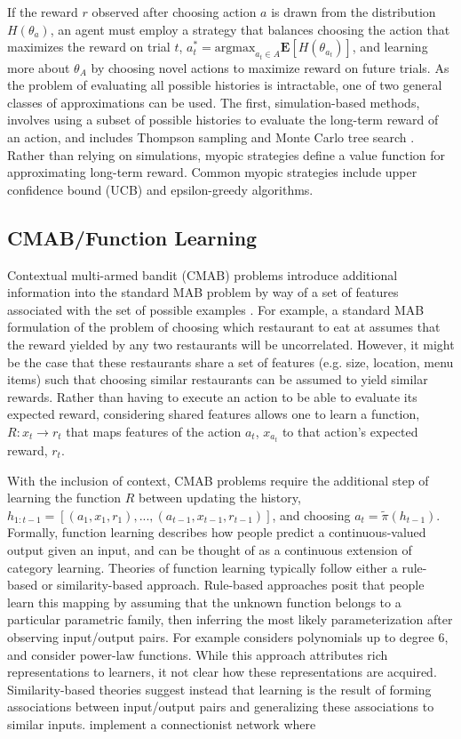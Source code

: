 \documentclass[10pt,letterpaper]{article}
\begin{document}
	If the reward $r$ observed after choosing action $a$ is drawn from the distribution $H(\theta_{a})$, an agent must employ a strategy that balances choosing the action that maximizes the reward on trial $t$, $a_{t}^{*} = \text{argmax}_{a_{t} \in A} \mathbf{E}[H(\theta_{a_{t}})]$, and learning more about $\theta_{A}$ by choosing novel actions to maximize reward on future trials. As the problem of evaluating all possible histories is intractable, one of two general classes of approximations can be used. The first, simulation-based methods, involves using a subset of possible histories to evaluate the long-term reward of an action, and includes Thompson sampling \citep{Thompson} and Monte Carlo tree search \citep{Coulom2007}. Rather than relying on simulations, myopic strategies define a value function for approximating long-term reward. Common myopic strategies include upper confidence bound (UCB) \citep{Agrawal} and epsilon-greedy \citep{Sutton1998a} algorithms.
	
	\subsection{CMAB/Function Learning}
	
	Contextual multi-armed bandit (CMAB) problems introduce additional information into the standard MAB problem by way of a set of features associated with the set of possible examples \citep{Langford}. For example, a standard MAB formulation of the problem of choosing which restaurant to eat at assumes that the reward yielded by any two restaurants will be uncorrelated. However, it might be the case that these restaurants share a set of features (e.g. size, location, menu items) such that choosing similar restaurants can be assumed to yield similar rewards. Rather than having to execute an action to be able to evaluate its expected reward, considering shared features allows one to learn a function, $R: x_{t} \to r_{t}$ that maps features of the action $a_{t}$, $x_{a_{t}}$ to that action's expected reward, $r_{t}$.
	
	With the inclusion of context, CMAB problems require the additional step of learning the function $R$ between updating the history, $h_{1:t-1} = [(a_{1}, x_{1}, r_{1}),...,(a_{t-1}, x_{t-1}, r_{t-1})]$, and choosing $a_{t} = \tilde{\pi}(h_{t-1})$. Formally, function learning describes how people predict a continuous-valued output given an input, and can be thought of as a continuous extension of category learning. Theories of function learning typically follow either a rule-based or similarity-based approach. Rule-based approaches posit that people learn this mapping by assuming that the unknown function belongs to a particular parametric family, then inferring the most likely parameterization after observing input/output pairs. For example \cite{Carroll} considers polynomials up to degree 6, and \cite{Koh} consider power-law functions. While this approach attributes rich representations to learners, it not clear how these representations are acquired. Similarity-based theories suggest instead that learning is the result of forming associations between input/output pairs and generalizing these associations to similar inputs. \cite{Busemeyer2005LearningFR} implement a connectionist network where
	
\end{document}
